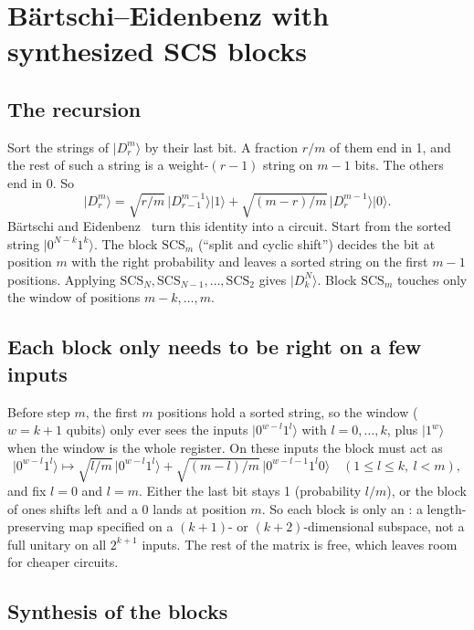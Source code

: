 \documentclass[11pt]{scrartcl}
\newcommand{\ket}[1]{\lvert #1\rangle}
\newcommand{\D}[2]{D^{#1}_{#2}}
\begin{document}
\section{Bärtschi--Eidenbenz with synthesized SCS blocks}\label{sec:be}

\subsection{The recursion}

Sort the strings of $\ket{\D mr}$ by their last bit. A fraction $r/m$ of them end in 1, and the rest
of such a string is a weight-$(r-1)$ string on $m-1$ bits. The others end in 0. So
\[
  \ket{\D mr}=\sqrt{r/m}\,\ket{\D{m-1}{r-1}}\ket1+\sqrt{(m-r)/m}\,\ket{\D{m-1}r}\ket0 .
\]
Bärtschi and Eidenbenz~\cite{be19} turn this identity into a circuit. Start from the sorted string
$\ket{0^{N-k}1^k}$. The block $\mathrm{SCS}_m$ (``split and cyclic shift'') decides the bit at
position $m$ with the right probability and leaves a sorted string on the first $m-1$ positions.
Applying $\mathrm{SCS}_N,\mathrm{SCS}_{N-1},\dots,\mathrm{SCS}_2$ gives $\ket{\D Nk}$. Block
$\mathrm{SCS}_m$ touches only the window of positions $m-k,\dots,m$.

\subsection{Each block only needs to be right on a few inputs}

Before step $m$, the first $m$ positions hold a sorted string, so the window ($w=k+1$ qubits) only
ever sees the inputs $\ket{0^{w-l}1^l}$ with $l=0,\dots,k$, plus $\ket{1^w}$ when the window is the
whole register. On these inputs the block must act as
\[
  \ket{0^{w-l}1^l}\mapsto\sqrt{l/m}\,\ket{0^{w-l}1^l}+\sqrt{(m-l)/m}\,\ket{0^{w-l-1}1^l0}
  \quad(1\le l\le k,\ l<m),
\]
and fix $l=0$ and $l=m$. Either the last bit stays 1 (probability $l/m$), or the block of ones
shifts left and a 0 lands at position $m$. So each block is only an : a
length-preserving map specified on a $(k+1)$- or $(k+2)$-dimensional subspace, not a full unitary
on all $2^{k+1}$ inputs. The rest of the matrix is free, which leaves room for cheaper circuits.

\subsection{Synthesis of the blocks}
\end{document}
